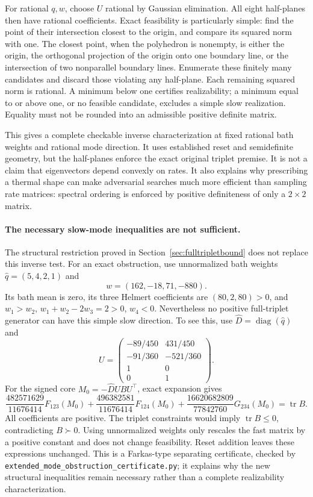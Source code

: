 For rational $q,w$, choose $U$ rational by Gaussian elimination. All eight
half-planes then have rational coefficients. Exact feasibility is particularly
simple: find the point of their intersection closest to the origin, and compare
its squared norm with one. The closest point, when the polyhedron is nonempty,
is either the origin, the orthogonal projection of the origin onto one boundary
line, or the intersection of two nonparallel boundary lines. Enumerate these
finitely many candidates and discard those violating any half-plane. Each
remaining squared norm is rational. A minimum below one certifies realizability;
a minimum equal to or above one, or no feasible candidate, excludes a simple
slow realization. Equality must not be rounded into an admissible positive
definite matrix.

This gives a complete checkable inverse characterization at fixed rational
bath weights and rational mode direction. It uses established reset and
semidefinite geometry, but the half-planes enforce the exact original triplet
premise. It is not a claim that eigenvectors depend convexly on rates. It also
explains why prescribing a thermal shape can make adversarial searches much
more efficient than sampling rate matrices: spectral ordering is enforced by
positive definiteness of only a $2\times2$ matrix.

\paragraph{The necessary slow-mode inequalities are not sufficient.}
The structural restriction proved in Section~\ref{sec:fulltripletbound}
does not replace this inverse test. For an exact obstruction, use
unnormalized bath weights $\widehat q=(5,4,2,1)$ and
\[
w=(162,-18,71,-880).
\]
Its bath mean is zero, its three Helmert coefficients are $(80,2,80)>0$,
and $w_1>w_2$, $w_1+w_2-2w_3=2>0$, $w_4<0$. Nevertheless no positive
full-triplet generator can have this simple slow direction. To see this,
use $\widehat D=\operatorname{diag}(\widehat q)$ and
\[
U=\begin{pmatrix}
-89/450&431/450\\ -91/360&-521/360\\1&0\\0&1
\end{pmatrix}.
\]
For the signed core $M_0=-\widehat DUBU^\top$, exact expansion gives
\[
\frac{482571629}{11676414}F_{123}(M_0)
+\frac{496382581}{11676414}F_{124}(M_0)
+\frac{16620682809}{77842760}G_{234}(M_0)
=\operatorname{tr}B.
\]
All coefficients are positive. The triplet constraints would imply
$\operatorname{tr}B\leq0$, contradicting $B\succ0$. Using unnormalized
weights only rescales the fast matrix by a positive constant and does not
change feasibility. Reset addition leaves these expressions unchanged.
This is a Farkas-type separating certificate, checked by
\texttt{extended\_mode\_obstruction\_certificate.py}; it explains why the
new structural inequalities remain necessary rather than a complete
realizability characterization.

